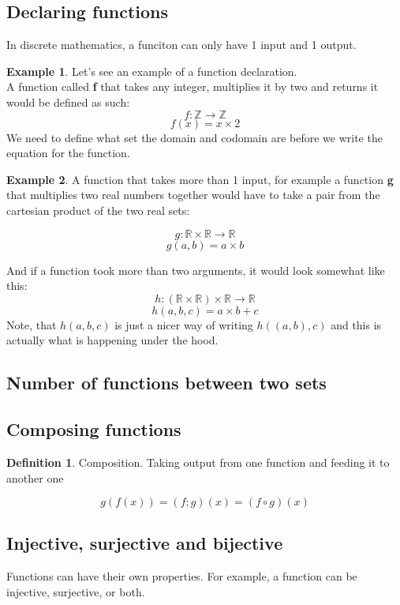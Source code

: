 \documentclass{article}
\theoremstyle{definition}
\newtheorem{df}{Definition}[section]
\newtheorem{ex}{Example}[section]
\begin{document}
\subsection{Declaring functions}
In discrete mathematics, a funciton can only have 1 input and 1 output.\\
\begin{ex}
Let's see an example of a function declaration.\\
A function called \textbf{f} that takes any integer, multiplies it by two and returns it would be defined as such:
\[f: \mathbb{Z} \rightarrow \mathbb{Z} \]
\[f(x) = x \times 2\]
We need to define what set the domain and codomain are before we write the equation for the function.\\
\end{ex}
\begin{ex}
A function that takes more than 1 input, for example a function \textbf{g} that multiplies two real numbers together would have to take a pair from the cartesian product of the two real sets:

\[g: \mathbb{R} \times \mathbb{R} \rightarrow \mathbb{R}\]
\[g(a,b) = a \times b\]

And if a function took more than two arguments, it would look somewhat like this:
\[h: (\mathbb{R} \times \mathbb{R}) \times \mathbb{R} \rightarrow \mathbb{R}\]
\[h(a,b,c) = a \times b + c\]
Note, that $h(a,b,c)$ is just a nicer way of writing $h((a,b), c)$ and this is actually what is happening under the hood.
\end{ex}

\subsection{Number of functions between two sets}

\subsection{Composing functions}
\begin{df}{Composition.}
	Taking output from one function and feeding it to another one
\end{df}
\[g(f(x)) = (f;g)(x) = (f \circ g)(x)\]
\subsection{Injective, surjective and bijective}
Functions can have their own properties. For example, a function can be injective, surjective, or both.
\end{document}
